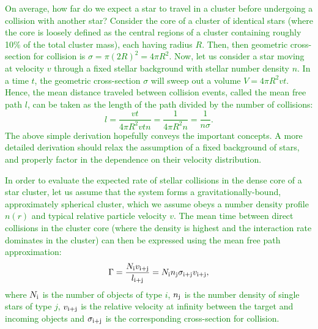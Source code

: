 \documentclass[main.tex]{subfiles}
\begin{document}
\begin{tcolorbox}[sharp corners, colback=green!30, colframe=green!80!blue, title=Mean Free Path Approximation]
\par \textcolor{green} {On average, how far do we expect a star to travel in a cluster before undergoing a collision with another star?  Consider the core of a cluster of identical stars (where the core is loosely defined as the central regions of a cluster containing roughly 10\% of the total cluster mass), each having radius $R$.  Then, then geometric cross-section for collision is $\sigma = \pi(2R)^2 = 4{\pi}R^2$.  Now, let us consider a star moving at velocity $v$ through a fixed stellar background with stellar number density $n$. In a time $t$, the geometric cross-section $\sigma$ will sweep out a volume $V = 4{\pi}R^2vt$.  Hence, the mean distance traveled between collision events, called the mean free path $l$, can be taken as the length of the path divided by the number of collisions:
\begin{equation}
l = \frac{vt}{4{\pi}R^2vtn} = \frac{1}{4{\pi}R^2n} = \frac{1}{n\sigma}.
\end{equation}
The above simple derivation hopefully conveys the important concepts.  A more detailed derivation should relax the assumption of a fixed background of stars, and properly factor in the dependence on their velocity distribution.} 
\end{tcolorbox} 

\begin{tcolorbox}[sharp corners, colback=green!30, colframe=green!80!blue, title=Collision Rate II]
\par \textcolor{green} {In order to evaluate the expected rate of stellar collisions in the dense core of a star cluster, let us assume that the system forms a gravitationally-bound, approximately spherical cluster, which we assume obeys a number density profile $n(r)$ and typical relative particle velocity $v$.  The mean time between direct collisions in the cluster core (where the density is highest and the interaction rate dominates in the cluster) can then be expressed using the mean free path approximation:
\begin{equation}
\label{eqn:mfp}
\Gamma = \frac{N_{\rm i}v_{\rm i+j}}{l_{\rm i+j}} = N_{\rm i}n_{\rm j}{\sigma_{\rm i+j}}v_{\rm i+j},
\end{equation} 
where $N_{\rm i}$ is the number of objects of type $i$, $n_{\rm j}$ is the number density of single stars of type $j$, $v_{\rm i+j}$ is the relative velocity at infinity between the target and incoming objects and $\sigma_{\rm i+j}$ is the corresponding cross-section for collision.
} 
\end{tcolorbox} 
\end{document}
